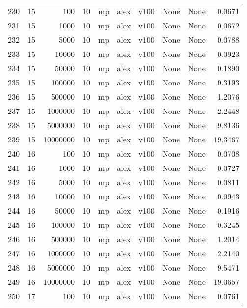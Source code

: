 \begin{tabular}{lrrrlllllr}
230 &  15 &       100 &      10 &   mp &  alex &  v100 &  None &  None &   0.0671 \\
231 &  15 &      1000 &      10 &   mp &  alex &  v100 &  None &  None &   0.0672 \\
232 &  15 &      5000 &      10 &   mp &  alex &  v100 &  None &  None &   0.0788 \\
233 &  15 &     10000 &      10 &   mp &  alex &  v100 &  None &  None &   0.0923 \\
234 &  15 &     50000 &      10 &   mp &  alex &  v100 &  None &  None &   0.1890 \\
235 &  15 &    100000 &      10 &   mp &  alex &  v100 &  None &  None &   0.3193 \\
236 &  15 &    500000 &      10 &   mp &  alex &  v100 &  None &  None &   1.2076 \\
237 &  15 &   1000000 &      10 &   mp &  alex &  v100 &  None &  None &   2.2448 \\
238 &  15 &   5000000 &      10 &   mp &  alex &  v100 &  None &  None &   9.8136 \\
239 &  15 &  10000000 &      10 &   mp &  alex &  v100 &  None &  None &  19.3467 \\
240 &  16 &       100 &      10 &   mp &  alex &  v100 &  None &  None &   0.0708 \\
241 &  16 &      1000 &      10 &   mp &  alex &  v100 &  None &  None &   0.0727 \\
242 &  16 &      5000 &      10 &   mp &  alex &  v100 &  None &  None &   0.0811 \\
243 &  16 &     10000 &      10 &   mp &  alex &  v100 &  None &  None &   0.0943 \\
244 &  16 &     50000 &      10 &   mp &  alex &  v100 &  None &  None &   0.1916 \\
245 &  16 &    100000 &      10 &   mp &  alex &  v100 &  None &  None &   0.3245 \\
246 &  16 &    500000 &      10 &   mp &  alex &  v100 &  None &  None &   1.2014 \\
247 &  16 &   1000000 &      10 &   mp &  alex &  v100 &  None &  None &   2.2140 \\
248 &  16 &   5000000 &      10 &   mp &  alex &  v100 &  None &  None &   9.5471 \\
249 &  16 &  10000000 &      10 &   mp &  alex &  v100 &  None &  None &  19.0657 \\
250 &  17 &       100 &      10 &   mp &  alex &  v100 &  None &  None &   0.0761 \\

\end{tabular}
